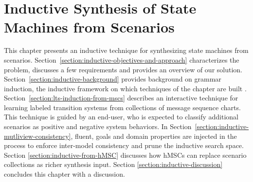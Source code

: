 \chapter{Inductive Synthesis of State Machines from Scenarios\label{chapter:inductive-synthesis}}

This chapter presents an inductive technique for synthesizing state machines from scenarios. Section~\ref{section:inductive-objectives-and-approach} characterizes the problem, discusses a few requirements and provides an overview of our solution. Section~\ref{section:inductive-background} provides background on grammar induction, the inductive framework on which techniques of the chapter are built \cite{Gold:1978}. Section~\ref{section:lts-induction-from-mscs} describes an interactive technique for learning labeled transition systems from collections of message sequence charts. This technique is guided by an end-user, who is expected to classify additional scenarios as positive and negative system behaviors. In Section~\ref{section:inductive-mutliview-consistency}, fluent, goals and domain properties are injected in the process to enforce inter-model consistency and prune the inductive search space. Section \ref{section:inductive-from-hMSC} discusses how hMSCs can replace scenario collections as richer synthesis input. Section \ref{section:inductive-discussion} concludes this chapter with a discussion. 








